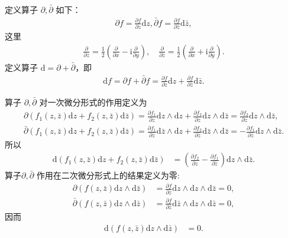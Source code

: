 \documentclass[../../main.tex]{subfiles}%
\begin{document}
\begin{definition}
定义算子 \( \partial,\bar{\partial} \) 如下：
\begin{align*}
\partial f = \frac{\partial f}{\partial z}\mathrm{d}z, 
\bar{\partial} f = \frac{\partial f}{\partial \bar{z}}\mathrm{d}\bar{z},
\end{align*}
这里
\begin{align*}
\frac{\partial}{\partial z} = \frac{1}{2}\left( \frac{\partial}{\partial x} - \text{i}\frac{\partial}{\partial y} \right), \quad
\frac{\partial}{\partial \overline{z}} = \frac{1}{2}\left( \frac{\partial}{\partial x} + \text{i}\frac{\partial}{\partial y} \right).
\end{align*}
定义算子 \( \mathrm{d} = \partial + \bar{\partial} \)，即
\begin{align}
\mathrm{d}f = \partial f + \bar{\partial} f = \frac{\partial f}{\partial z}\mathrm{d}z + \frac{\partial f}{\partial \bar{z}}\mathrm{d}\bar{z}. \label{eq:::--zzzzzzwerwbdesgrgreeaaaaaawssssf--ewfwess3323243z34f239fh2cj8q2rvrmvsz11}
\end{align}
\end{definition}

\begin{definition}
算子 \( \partial,\bar{\partial} \) 对一次微分形式的作用定义为
\begin{gather*}
\partial(f_1(z,\bar{z})\mathrm{d}z + f_2(z,\bar{z})\mathrm{d}\bar{z}) = \frac{\partial f_1}{\partial z}\mathrm{d}z \wedge \mathrm{d}z + \frac{\partial f_2}{\partial z}\mathrm{d}z \wedge \mathrm{d}\bar{z} = \frac{\partial f_2}{\partial z}\mathrm{d}z \wedge \mathrm{d}\bar{z},
\\
\bar{\partial}(f_1(z,\bar{z})\mathrm{d}z + f_2(z,\bar{z})\mathrm{d}\bar{z}) = \frac{\partial f_1}{\partial \bar{z}}\mathrm{d}\bar{z} \wedge \mathrm{d}z + \frac{\partial f_2}{\partial \bar{z}}\mathrm{d}\bar{z} \wedge \mathrm{d}\bar{z} = -\frac{\partial f_1}{\partial \bar{z}}\mathrm{d}z \wedge \mathrm{d}\bar{z}.
\end{gather*}
所以
\begin{align}
\mathrm{d}(f_1(z,\bar{z})\mathrm{d}z + f_2(z,\bar{z})\mathrm{d}\bar{z}) &= \left( \frac{\partial f_2}{\partial z} - \frac{\partial f_1}{\partial \bar{z}} \right) \mathrm{d}z \wedge \mathrm{d}\bar{z}. \label{eq:::--38289y34f239fh2cj8q2rvrmvsz11}
\end{align}
算子\( \partial,\bar{\partial} \) 作用在二次微分形式上的结果定义为零:
\begin{align*}
\partial(f(z,\bar{z})\mathrm{d}z \wedge \mathrm{d}\bar{z}) &= \frac{\partial f}{\partial z}\mathrm{d}z \wedge \mathrm{d}z \wedge \mathrm{d}\bar{z} = 0, \\
\bar{\partial}(f(z,\bar{z})\mathrm{d}z \wedge \mathrm{d}\bar{z}) &= \frac{\partial f}{\partial \bar{z}}\mathrm{d}\bar{z} \wedge \mathrm{d}z \wedge \mathrm{d}\bar{z} = 0,
\end{align*}
因而
\begin{align}
\mathrm{d}(f(z,\bar{z})\mathrm{d}z \wedge \mathrm{d}\bar{z}) &= 0. \label{eq:::--zzzzzzss3323243z34f239fh2cj8q2rvrmvsz11}
\end{align}
\end{definition}
\end{document}
